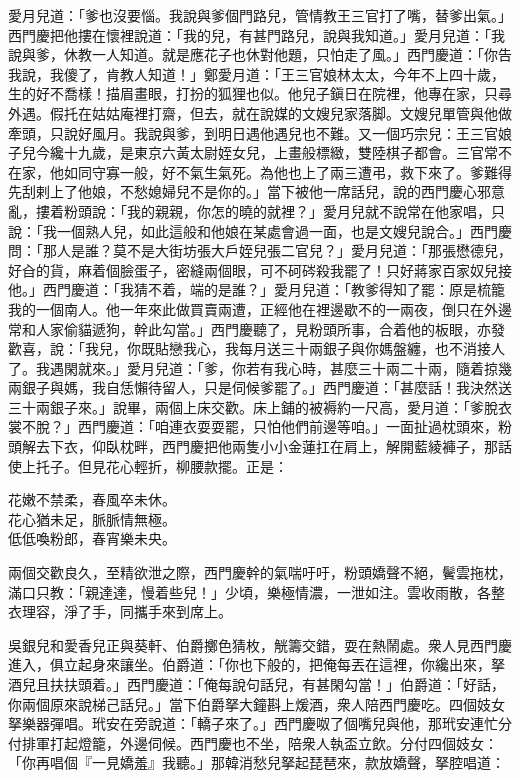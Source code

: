 愛月兒道：「爹也沒要惱。我說與爹個門路兒，管情教王三官打了嘴，替爹出氣。」西門慶把他摟在懷裡說道：「我的兒，有甚門路兒，說與我知道。」愛月兒道：「我說與爹，休教一人知道。就是應花子也休對他題，只怕走了風。」西門慶道：「你告我說，我傻了，肯教人知道！」鄭愛月道：「王三官娘林太太，今年不上四十歲，生的好不喬樣！描眉畫眼，打扮的狐狸也似。{}他兒子鎭日在院裡，他專在家，只尋外遇。假托在姑姑庵裡打齋，但去，就在說媒的文嫂兒家落脚。文嫂兒單管與他做牽頭，只說好風月。我說與爹，到明日遇他遇兒也不難。又一個巧宗兒：王三官娘子兒今纔十九歲，是東京六黃太尉姪女兒，上畫般標緻，雙陸棋子都會。三官常不在家，他如同守寡一般，好不氣生氣死。為他也上了兩三遭弔，救下來了。爹難得先刮剌上了他娘，不愁媳婦兒不是你的。」{}當下被他一席話兒，說的西門慶心邪意亂，摟着粉頭說：「我的親親，你怎的曉的就裡？」愛月兒就不說常在他家唱，只說：「我一個熟人兒，如此這般和他娘在某處會過一面，也是文嫂兒說合。」西門慶問：「那人是誰？莫不是大街坊張大戶姪兒張二官兒？」{}愛月兒道：「那張懋德兒，好㒲的貨，麻着個臉蛋子，密縫兩個眼，可不砢硶殺我罷了！{}只好蔣家百家奴兒接他。」西門慶道：「我猜不着，端的是誰？」愛月兒道：「教爹得知了罷：原是梳籠我的一個南人。他一年來此做買賣兩遭，正經他在裡邊歇不的一兩夜，倒只在外邊常和人家偷貓遞狗，幹此勾當。」西門慶聽了，見粉頭所事，合着他的板眼，亦發歡喜，說：「我兒，你既貼戀我心，我每月送三十兩銀子與你媽盤纏，也不消接人了。我遇閑就來。」愛月兒道：「爹，你若有我心時，甚麼三十兩二十兩，隨着掠幾兩銀子與媽，我自恁懶待留人，只是伺候爹罷了。」西門慶道：「甚麼話！我決然送三十兩銀子來。」說畢，兩個上床交歡。床上鋪的被褥約一尺高，愛月道：「爹脫衣裳不脫？」西門慶道：「咱連衣耍耍罷，只怕他們前邊等咱。」一面扯過枕頭來，粉頭解去下衣，仰臥枕畔，西門慶把他兩隻小小金蓮扛在肩上，解開藍綾褲子，那話使上托子。但見花心輕折，柳腰款擺。正是：

\begin{myquote} 
花嫩不禁柔，春風卒未休。\\花心猶未足，脈脈情無極。\\低低喚粉郎，春宵樂未央。{}
\end{myquote} 

兩個交歡良久，至精欲泄之際，西門慶幹的氣喘吁吁，粉頭嬌聲不絕，鬢雲拖枕，滿口只教：「親達達，慢着些兒！」少頃，樂極情濃，一泄如注。雲收雨散，各整衣理容，淨了手，同攜手來到席上。

吳銀兒和愛香兒正與葵軒、伯爵擲色猜枚，觥籌交錯，耍在熱鬧處。衆人見西門慶進入，俱立起身來讓坐。伯爵道：「你也下般的，把俺每丟在這裡，你纔出來，拏酒兒且扶扶頭着。」西門慶道：「俺每說句話兒，有甚閑勾當！」伯爵道：「好話，你兩個原來說梯己話兒。」當下伯爵拏大鐘斟上煖酒，衆人陪西門慶吃。四個妓女拏樂器彈唱。玳安在旁說道：「轎子來了。」西門慶呶了個嘴兒與他，那玳安連忙分付排軍打起燈籠，外邊伺候。西門慶也不坐，陪衆人執盃立飲。分付四個妓女：「你再唱個『一見嬌羞』我聽。」那韓消愁兒拏起琵琶來，款放嬌聲，拏腔唱道：

